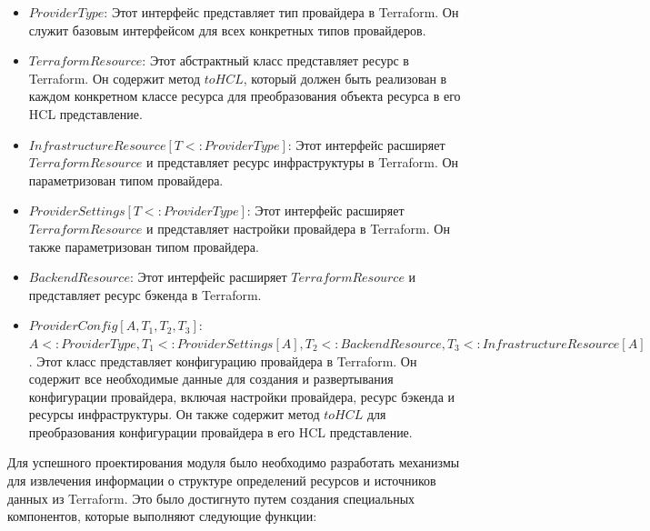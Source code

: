 \begin{itemize}
\item $ProviderType$: Этот интерфейс представляет тип провайдера в
Terraform. Он служит базовым интерфейсом для всех конкретных типов провайдеров.

\item $TerraformResource$: Этот абстрактный класс представляет ресурс в
Terraform. Он содержит метод $toHCL$, который должен быть реализован в
каждом конкретном классе ресурса для преобразования объекта ресурса в его HCL
представление.

\item $InfrastructureResource[T <: ProviderType]$: Этот интерфейс
расширяет \newline $TerraformResource$ и представляет ресурс инфраструктуры в
Terraform. Он параметризован типом провайдера.

\item $ProviderSettings[T <: ProviderType]$: Этот интерфейс расширяет
\newline $TerraformResource$ и представляет настройки провайдера в Terraform.
Он также параметризован типом провайдера.

\item $BackendResource$: Этот интерфейс расширяет
$TerraformResource$ и представляет ресурс бэкенда в Terraform.

\item $ProviderConfig[A, T_1, T_2, T_3]$: 
$A <: ProviderType, T_1 <: ProviderSettings[A], T_2 <:
BackendResource, T_3 <: InfrastructureResource[A]$. 
Этот класс представляет конфигурацию провайдера в Terraform.
Он содержит все необходимые данные для создания и развертывания
конфигурации провайдера, включая настройки провайдера,
ресурс бэкенда и ресурсы инфраструктуры. Он также содержит метод $toHCL$
для преобразования конфигурации провайдера в его HCL представление.
\end{itemize}

Для успешного проектирования модуля было необходимо разработать механизмы для
извлечения информации о структуре определений ресурсов и источников данных из
Terraform. Это было достигнуто путем создания специальных компонентов, которые
выполняют следующие функции:

